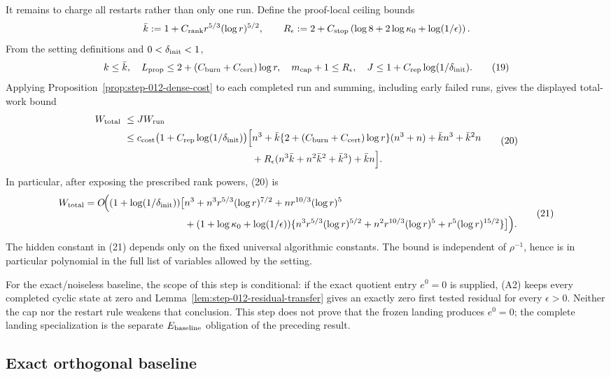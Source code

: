 It remains to charge all restarts rather than only one run.  Define the
proof-local ceiling bounds
\[
 \bar k:=1+C_{\rm rank}r^{5/3}(\log r)^{5/2},\qquad
 R_\epsilon:=2+C_{\rm stop}
 \left(\log8+2\log\kappa_0+\log(1/\epsilon)\right).
\]
From the setting definitions and \(0<\delta_{\rm init}<1\),
\[
 k\le\bar k,\quad
 L_{\rm prop}\le2+(C_{\rm burn}+C_{\rm cert})\log r,\quad
 m_{\rm cap}+1\le R_\epsilon,\quad
 J\le1+C_{\rm rep}\log(1/\delta_{\rm init}).
\tag{19}
\]
Applying Proposition~\ref{prop:step-012-dense-cost} to each completed run
and summing, including early failed runs, gives the displayed total-work
bound
\[
\begin{aligned}
 W_{\rm total}\ &\le J W_{\rm run}\\
 &\le c_{\rm cost}\bigl(1+C_{\rm rep}\log(1/\delta_{\rm init})\bigr)
 \Big[ n^3
 +\bar k\{2+(C_{\rm burn}+C_{\rm cert})\log r\}(n^3+n)
 +\bar k n^3+\bar k^2n\\
 &\hspace{46mm}
 +R_\epsilon(n^3\bar k+n^2\bar k^2+\bar k^3)+\bar k n\Big].
\end{aligned}
\tag{20}
\]
In particular, after exposing the prescribed rank powers, (20) is
\[
\begin{aligned}
 W_{\rm total}=O\!\Big((1+\log(1/\delta_{\rm init}))\big[&n^3
 +n^3r^{5/3}(\log r)^{7/2}+nr^{10/3}(\log r)^5\\
 &+(1+\log\kappa_0+\log(1/\epsilon))
 \{n^3r^{5/3}(\log r)^{5/2}
 +n^2r^{10/3}(\log r)^5+r^5(\log r)^{15/2}\}\big]\Big).
\end{aligned}
\tag{21}
\]
The hidden constant in (21) depends only on the fixed universal algorithmic
constants.  The bound is independent of \(\rho^{-1}\), hence is in
particular polynomial in the full list of variables allowed by the setting.

For the exact/noiseless baseline, the scope of this step is conditional: if
the exact quotient entry \(e^0=0\) is supplied, (A2) keeps every completed
cyclic state at zero and Lemma~\ref{lem:step-012-residual-transfer} gives an
exactly zero first tested residual for every \(\epsilon>0\).  Neither the cap
nor the restart rule weakens that conclusion.  This step does not prove that
the frozen landing produces \(e^0=0\); the complete landing specialization is
the separate \(E_{\rm baseline}\) obligation of the preceding result.

\subsection{Exact orthogonal baseline}\label{app:step-013}

